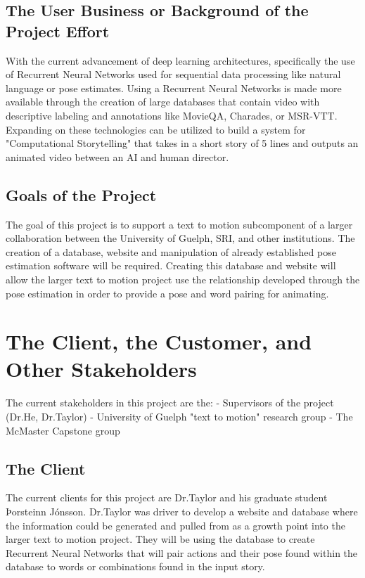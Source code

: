 \documentclass{scrreprt}
\begin{document}
\subsection{The User Business or Background of the Project Effort}

With the current advancement of deep learning architectures, specifically the
use of Recurrent Neural Networks used for sequential data processing like
natural language or pose estimates. Using a Recurrent Neural Networks is made
more available through the creation of large databases that contain video with
descriptive labeling and annotations like MovieQA, Charades, or MSR-VTT.
Expanding on these technologies can be utilized to build a system for
"Computational Storytelling" that takes in a short story of 5 lines and outputs
an animated video between an AI and human director.

\subsection{Goals of the Project}

The goal of this project is to support a text to motion subcomponent of a
larger collaboration between the University of Guelph, SRI, and other
institutions. The creation of a database, website and manipulation of already
established pose estimation software will be required. Creating this database
and website will allow the larger text to motion project use the relationship
developed through the pose estimation in order to provide a pose and word
pairing for animating.

\section{The Client, the Customer, and Other Stakeholders}

The current stakeholders in this project are the:
    - Supervisors of the project (Dr.He, Dr.Taylor)
    - University of Guelph "text to motion" research group
    - The McMaster Capstone group

\subsection{The Client}

The current clients for this project are Dr.Taylor and his graduate student
Þorsteinn Jónsson. Dr.Taylor was driver to develop a website and database where
the information could be generated and pulled from as a growth point into the
larger text to motion project. They will be using the database to create
Recurrent Neural Networks that will pair actions and their pose found within
the database to words or combinations found in the input story.
\end{document}
